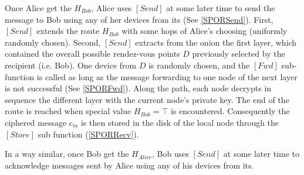 
Once Alice get the \(H_{Bob}\), Alice uses \([Send]\) at some
later time to send the message to Bob using any of her devices from
its \squad (See \cref{SPORSend}). First, \([Send]\) extends the route
\(H_{Bob}\) with some hops of Alice's choosing (uniformly randomly
chosen). Second, \([Send]\) extracts from the onion the first
layer, which contained the overall
possible rendez-vous points $D$ previously selected by the recipient (i.e. Bob).
One device from $D$ is randomly chosen, and the \([Fwd]\)
sub-function is called as long as the message forwarding to one node of
the next layer is not successful (See \cref{SPORFwd}). Along the path, each node decrypts
in sequence the different layer with the current node’s private key. 
The end of the route is reached when special value \(H_{Bob} = \top\) is
encountered. Consequently the ciphered message \(c_m\) is then stored
in the disk of the local node through the \([Store]\) sub function 
(\cref{SPORRecv}).

In a way similar, once Bob get the \(H_{Alice}\), Bob uses \([Send]\) at some
later time to acknowledge messages sent by Alice using any of his devices from
its\squad.





 

